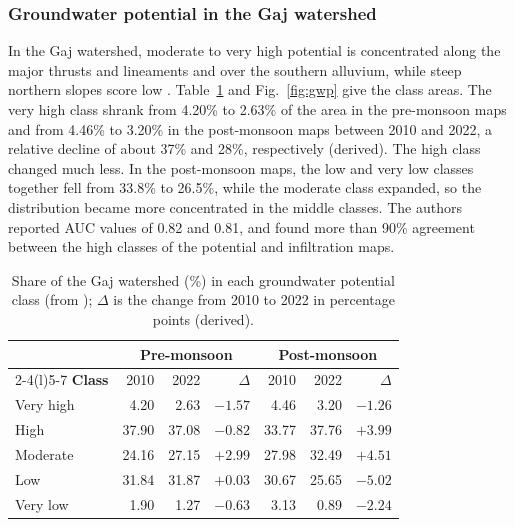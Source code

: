 \documentclass[10pt,a4paper,twocolumn]{article}
\begin{document}
\subsubsection{Groundwater potential in the Gaj watershed}
In the Gaj watershed, moderate to very high potential is concentrated along the major thrusts
and lineaments and over the southern alluvium, while steep northern slopes score low
\citep{sharma2025}. Table~\ref{tab:gwp} and Fig.~\ref{fig:gwp} give the class areas. The very
high class shrank from 4.20\% to 2.63\% of the area in the pre-monsoon maps and from 4.46\% to
3.20\% in the post-monsoon maps between 2010 and 2022, a relative decline of about 37\% and 28\%,
respectively (derived). The high class changed much less. In the post-monsoon maps, the low and
very low classes together fell from 33.8\% to 26.5\%, while the moderate class expanded, so the
distribution became more concentrated in the middle classes. The authors reported AUC values of
0.82 and 0.81, and found more than 90\% agreement between the high classes of the potential and
infiltration maps.

\begin{table}[t]
\centering
\caption{Share of the Gaj watershed (\%) in each groundwater potential class (from
\citealp{sharma2025}); $\Delta$ is the change from 2010 to 2022 in percentage points (derived).}
\label{tab:gwp}
\footnotesize
\setlength{\tabcolsep}{4pt}
\begin{tabular}{@{}lrrrrrr@{}}
\toprule
& \multicolumn{3}{c}{\textbf{Pre-monsoon}} & \multicolumn{3}{c}{\textbf{Post-monsoon}}\\
\cmidrule(lr){2-4}\cmidrule(l){5-7}
\textbf{Class} & 2010 & 2022 & $\Delta$ & 2010 & 2022 & $\Delta$\\
\midrule
Very high & 4.20 & 2.63 & $-1.57$ & 4.46 & 3.20 & $-1.26$\\
High & 37.90 & 37.08 & $-0.82$ & 33.77 & 37.76 & $+3.99$\\
Moderate & 24.16 & 27.15 & $+2.99$ & 27.98 & 32.49 & $+4.51$\\
Low & 31.84 & 31.87 & $+0.03$ & 30.67 & 25.65 & $-5.02$\\
Very low & 1.90 & 1.27 & $-0.63$ & 3.13 & 0.89 & $-2.24$\\
\bottomrule
\end{tabular}
\end{table}
\end{document}
